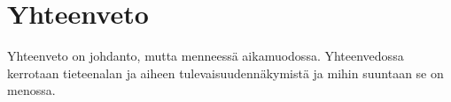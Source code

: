\chapter{Yhteenveto\label{conclusions}}
Yhteenveto on johdanto, mutta menneessä aikamuodossa. Yhteenvedossa kerrotaan tieteenalan ja aiheen tulevaisuudennäkymistä ja mihin suuntaan se on menossa.